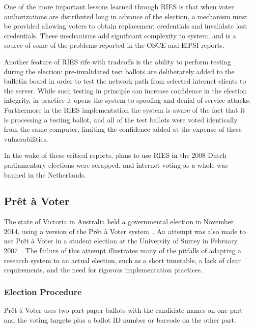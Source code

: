 One of the more important lessons learned through RIES is that when
voter authorizations are distributed long in advance of the election,
a mechanism must be provided allowing voters to obtain replacement
credentials and invalidate lost credentials. These mechanisms add
significant complexity to system, and is a source of some of the
problems reported in the OSCE and EiPSI reports.

Another feature of RIES rife with tradeoffs is the ability to perform
testing during the election: pre-invalidated test ballots are
deliberately added to the bulletin board in order to test the network
path from selected internet clients to the server. While such testing
in principle can increase confidence in the election integrity, in
practice it opens the system to spoofing and denial of service
attacks. Furthermore in the RIES implementation the system is aware of
the fact that it is processing a testing ballot, and all of the test
ballots were voted identically from the same computer, limiting the
confidence added at the expense of these vulnerabilities.

In the wake of these critical reports, plans to use RIES in the 2008
Dutch parliamentary elections were scrapped, and internet voting as a
whole was banned in the Netherlands.

\subsection{Prêt à Voter~\cite{chaum2005}}
\label{sec:pret-voter}

The state of Victoria in Australia held a governmental election in
November 2014, using a version of the Prêt à Voter
system~\cite{burton2012}. An attempt was also made to use Prêt à Voter
in a student election at the University of Surrey in February
2007~\cite{bismark2007}. The failure of this attempt illustrates many
of the pitfalls of adapting a research system to an actual election,
such as a short timetable, a lack of clear requirements, and the need
for rigorous implementation practices.

\subsubsection{Election Procedure}

Prêt à Voter uses two-part paper ballots with the candidate names on
one part and the voting targets plus a ballot ID number or barcode on
the other part.

